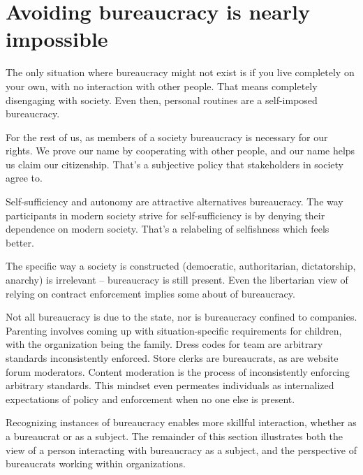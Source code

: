 \section{Avoiding bureaucracy is nearly impossible}

The only situation where bureaucracy might not exist is if you live completely on your own, with no interaction with other people. That means completely disengaging with society. Even then, personal routines are a self-imposed bureaucracy.


For the rest of us, as members of a society bureaucracy is necessary for our rights. We prove our name by cooperating with other people, and our name helps us claim our citizenship. That's a subjective policy that \glspl{stakeholder} in society agree to. 

Self-sufficiency and autonomy are attractive alternatives bureaucracy. The way participants in modern society strive for self-sufficiency is by denying their dependence on modern society. That's a relabeling of selfishness which feels better. 

The specific way a society is constructed (democratic, authoritarian, dictatorship, anarchy) is irrelevant -- bureaucracy is still present. Even the libertarian view of relying on contract enforcement implies some about of bureaucracy. 


Not all bureaucracy is due to the state, nor is bureaucracy confined to companies. Parenting involves coming up with situation-specific requirements for children, with the organization being the family. Dress codes for team are arbitrary standards inconsistently enforced. 
Store clerks are bureaucrats, as are website forum moderators.  Content moderation is the process of inconsistently enforcing arbitrary standards. This mindset even permeates individuals as internalized expectations of policy and enforcement when no one else is present. 

Recognizing instances of bureaucracy enables more skillful interaction, whether as a bureaucrat or as a subject. The remainder of this section  illustrates both the view of a person interacting with bureaucracy as a \gls{subject}, and the perspective of bureaucrats working within organizations. 




